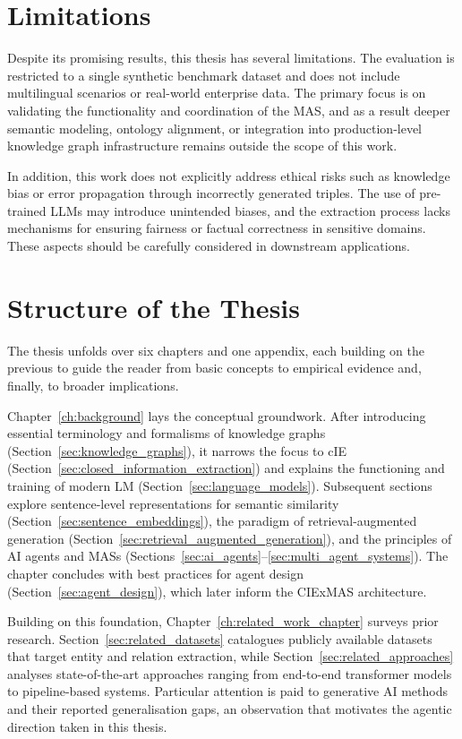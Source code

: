\documentclass[a4paper,oneside,bibliography=totoc]{scrbook}
\begin{document}
\section{Limitations}
\label{sec:limitations}

Despite its promising results, this thesis has several limitations. The evaluation is restricted to a single synthetic benchmark dataset and does not include multilingual scenarios or real-world enterprise data. The primary focus is on validating the functionality and coordination of the \ac{MAS}, and as a result deeper semantic modeling, ontology alignment, or integration into production-level knowledge graph infrastructure remains outside the scope of this work.

In addition, this work does not explicitly address ethical risks such as knowledge bias or error propagation through incorrectly generated triples. The use of pre-trained \acp{LLM} may introduce unintended biases, and the extraction process lacks mechanisms for ensuring fairness or factual correctness in sensitive domains. These aspects should be carefully considered in downstream applications.

\section{Structure of the Thesis}
\label{sec:structure}

The thesis unfolds over six chapters and one appendix, each building on the previous to guide the reader from basic concepts to empirical evidence and, finally, to broader implications.

Chapter~\ref{ch:background} lays the conceptual groundwork. After introducing essential terminology and formalisms of knowledge graphs (Section~\ref{sec:knowledge_graphs}), it narrows the focus to \ac{cIE} (Section~\ref{sec:closed_information_extraction}) and explains the functioning and training of modern \ac{LM} (Section~\ref{sec:language_models}). Subsequent sections explore sentence-level representations for semantic similarity (Section~\ref{sec:sentence_embeddings}), the paradigm of retrieval-augmented generation (Section~\ref{sec:retrieval_augmented_generation}), and the principles of AI agents and \acp{MAS} (Sections~\ref{sec:ai_agents}–\ref{sec:multi_agent_systems}). The chapter concludes with best practices for agent design (Section~\ref{sec:agent_design}), which later inform the CIExMAS architecture.

Building on this foundation, Chapter~\ref{ch:related_work_chapter} surveys prior research. Section~\ref{sec:related_datasets} catalogues publicly available datasets that target entity and relation extraction, while Section~\ref{sec:related_approaches} analyses state-of-the-art approaches ranging from end-to-end transformer models to pipeline-based systems. Particular attention is paid to generative AI methods and their reported generalisation gaps, an observation that motivates the agentic direction taken in this thesis.
\end{document}
